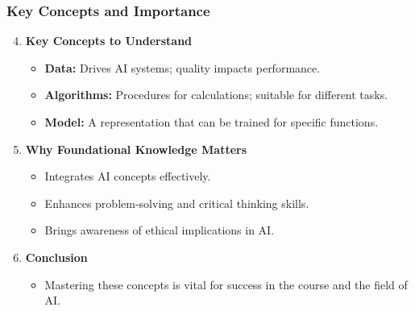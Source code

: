 \documentclass[aspectratio=169]{beamer}
\begin{document}
\begin{frame}[fragile]
    \frametitle{Key Concepts and Importance}

    \begin{enumerate}
        \setcounter{enumi}{3} %
        \item \textbf{Key Concepts to Understand}
        \begin{itemize}
            \item \textbf{Data:} Drives AI systems; quality impacts performance.
            \item \textbf{Algorithms:} Procedures for calculations; suitable for different tasks.
            \item \textbf{Model:} A representation that can be trained for specific functions.
        \end{itemize}

        \item \textbf{Why Foundational Knowledge Matters}
        \begin{itemize}
            \item Integrates AI concepts effectively.
            \item Enhances problem-solving and critical thinking skills.
            \item Brings awareness of ethical implications in AI.
        \end{itemize}
        
        \item \textbf{Conclusion}
        \begin{itemize}
            \item Mastering these concepts is vital for success in the course and the field of AI.
        \end{itemize}
    \end{enumerate}
\end{frame}
\end{document}
